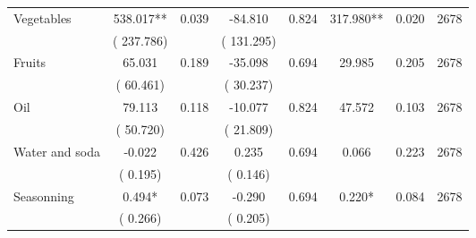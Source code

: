 \begin{tabular}{l*{7}{c}}
 Vegetables       &            538.017**       &        0.039  &            -84.810       &        0.824  &            317.980**       &              0.020 &  2678 \\ 
                       &       (     237.786)             &                               &       (     131.295)                     &                               &                                               &                                &                      \\ 

 Fruits       &             65.031       &        0.189  &            -35.098       &        0.694  &             29.985       &              0.205 &  2678 \\ 
                       &       (      60.461)             &                               &       (      30.237)                     &                               &                                               &                                &                      \\ 

 Oil       &             79.113       &        0.118  &            -10.077       &        0.824  &             47.572       &              0.103 &  2678 \\ 
                       &       (      50.720)             &                               &       (      21.809)                     &                               &                                               &                                &                      \\ 

 Water and soda       &             -0.022       &        0.426  &              0.235       &        0.694  &              0.066       &              0.223 &  2678 \\ 
                       &       (       0.195)             &                               &       (       0.146)                     &                               &                                               &                                &                      \\ 

 Seasonning       &              0.494*       &        0.073  &             -0.290       &        0.694  &              0.220*       &              0.084 &  2678 \\ 
                       &       (       0.266)             &                               &       (       0.205)                     &                               &                                               &                                &                      \\ 


\end{tabular}
